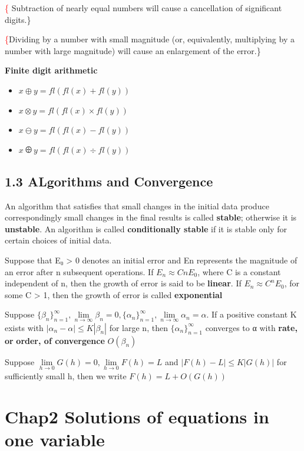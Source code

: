 \documentclass[11pt]{article}
\begin{document}
\textcolor{red}\{ Subtraction of nearly equal numbers will
cause a cancellation of significant digits.\} 


\textcolor{red}\{Dividing by a number with small magnitude (or, 
equivalently, multiplying by a number with large magnitude) will 
cause an enlargement of the error.\} 

\textbf{Finite digit arithmetic}

\begin{itemize}
\item \(x\oplus y=fl(fl(x)+fl(y))\)
\item \(x\otimes y=fl(fl(x)\times fl(y))\)
\item \(x\ominus y=fl(fl(x)-fl(y))\)
\item \(x\odiv y=fl(fl(x)\div fl(y))\)
\end{itemize}

\subsection{1.3 ALgorithms and Convergence}
\label{sec:orgdb8a87b}
An algorithm that satisfies that small changes in the initial data produce
correspondingly small changes in the final results is called \textbf{stable};
otherwise it is \textbf{unstable}. An algorithm is called \textbf{conditionally stable} if it
is stable only for certain choices of initial data. 

Suppose that E₀ > 0 denotes an initial error and En represents the magnitude
of an error after n subsequent operations. If \(E_n\approx CnE_0\), where C is a
constant independent of n, then the growth of error is said to be \textbf{linear}. If
\(E_n\approx C^nE_0\), for some C > 1, then the growth of error is called \textbf{exponential} 

Suppose \(\{\beta_n\}_{n=1}^\infty, \lim\limits_{n \to \infty}\beta_n=0,
   \{\alpha_n\}_{n=1}^\infty, \lim\limits_{n\to\infty}\alpha_n=\alpha\).
If a positive constant K exists with \(|\alpha_n-\alpha|\le K|\beta_n|\) for
large n, then \(\{\alpha_n\}_{n=1}^\infty\) converges to α with \textbf{rate, or}
\textbf{order, of convergence} \(O(\beta_n)\)

Suppose \(\lim\limits_{h\to 0}G(h)=0, \lim\limits_{h\to 0}F(h)=L\) and
\(|F(h)-L|\le K|G(h)|\) for sufficiently small h, then we write
\(F(h)=L+O(G(h))\)
\section{Chap2 Solutions of equations in one variable}
\label{sec:org6b296c8}
\end{document}
